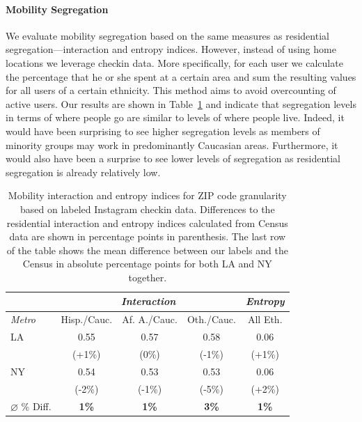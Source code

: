 \paragraph{Mobility Segregation}

We evaluate mobility segregation based on the same measures as residential segregation---interaction and entropy indices. However, instead of using home locations we leverage checkin data. More specifically, for each user we calculate the percentage that he or she spent at a certain area and sum the resulting values for all users of a certain ethnicity. This method aims to avoid overcounting of active users. Our results are shown in Table~\ref{tab:interactionEntropy} and indicate that segregation levels in terms of where people go are similar to levels of where people live. Indeed, it would have been surprising to see higher segregation levels as members of minority groups may work in predominantly Caucasian areas. Furthermore, it would also have been a surprise to see lower levels of segregation as residential segregation is already relatively low.

\begin{table}[h]
\centering
{\small
\begin{tabular}{| l | c | c | c | c |}
\hline
 & \multicolumn{3}{c|}{\textit{Interaction}} & \textit{Entropy} \\ \hline
\textit{Metro} & Hisp./Cauc. & Af. A./Cauc. & Oth./Cauc. & All Eth.    \\ \hline
LA             & 0.55        & 0.57         & 0.58       & 0.06      \\
               & (+1\%)      & (0\%)        & (-1\%)     & (+1\%)   \\ \hline
NY             & 0.54        & 0.53         & 0.53       & 0.06     \\
               & (-2\%)      & (-1\%)       & (-5\%)     & (+2\%)   \\ \hline
$\varnothing$ \% Diff. & \textbf{1\%} & \textbf{1\%} & \textbf{3\%} & \textbf{1\%} \\ \hline							
\end{tabular}
}
\caption{Mobility interaction and entropy indices for ZIP code granularity based on labeled Instagram checkin data. Differences to the residential interaction and entropy indices calculated from Census data are shown in percentage points in parenthesis. The last row of the table shows the mean difference between our labels and the Census in absolute percentage points for both LA and NY together.}
\label{tab:interactionEntropy}
\end{table}

